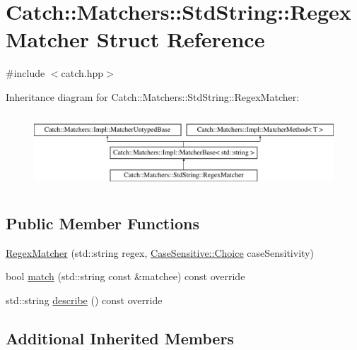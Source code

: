 \hypertarget{struct_catch_1_1_matchers_1_1_std_string_1_1_regex_matcher}{}\section{Catch\+:\+:Matchers\+:\+:Std\+String\+:\+:Regex\+Matcher Struct Reference}
\label{struct_catch_1_1_matchers_1_1_std_string_1_1_regex_matcher}


{\ttfamily \#include $<$catch.\+hpp$>$}

Inheritance diagram for Catch\+:\+:Matchers\+:\+:Std\+String\+:\+:Regex\+Matcher\+:\begin{figure}[H]
\begin{center}
\leavevmode
\includegraphics[height=2.818792cm]{struct_catch_1_1_matchers_1_1_std_string_1_1_regex_matcher}
\end{center}
\end{figure}
\subsection*{Public Member Functions}
\begin{DoxyCompactItemize}
\item 
\mbox{\hyperlink{struct_catch_1_1_matchers_1_1_std_string_1_1_regex_matcher_ab914deb885fe25558c41ab368c6b3916}{Regex\+Matcher}} (std\+::string regex, \mbox{\hyperlink{struct_catch_1_1_case_sensitive_aad49d3aee2d97066642fffa919685c6a}{Case\+Sensitive\+::\+Choice}} case\+Sensitivity)
\item 
bool \mbox{\hyperlink{struct_catch_1_1_matchers_1_1_std_string_1_1_regex_matcher_aa8e61adccabb2f36133029301f6b8f4e}{match}} (std\+::string const \&matchee) const override
\item 
std\+::string \mbox{\hyperlink{struct_catch_1_1_matchers_1_1_std_string_1_1_regex_matcher_a1f788cd5258c987e5043f6c7f43adeb9}{describe}} () const override
\end{DoxyCompactItemize}
\subsection*{Additional Inherited Members}



